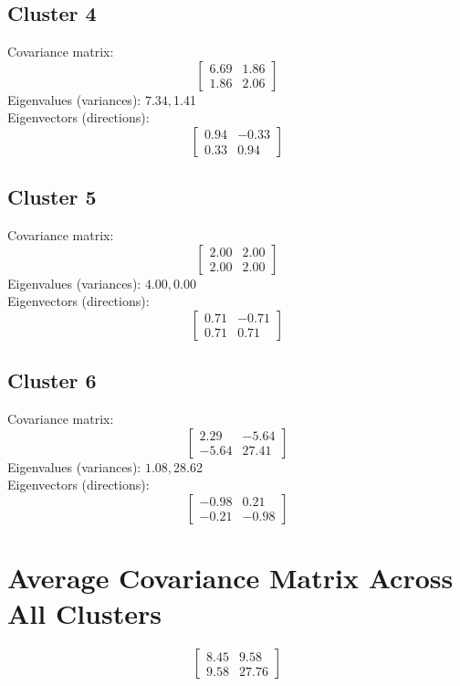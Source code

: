 \documentclass{article}
\begin{document}
\subsection*{Cluster 4}
Covariance matrix:
\[\begin{bmatrix}6.69 & 1.86 \\1.86 & 2.06\end{bmatrix}\]
Eigenvalues (variances): $ 7.34, $1.41\\
Eigenvectors (directions):
\[\begin{bmatrix}0.94 & -0.33 \\0.33 & 0.94\end{bmatrix}\]
\subsection*{Cluster 5}
Covariance matrix:
\[\begin{bmatrix}2.00 & 2.00 \\2.00 & 2.00\end{bmatrix}\]
Eigenvalues (variances): $ 4.00, $0.00\\
Eigenvectors (directions):
\[\begin{bmatrix}0.71 & -0.71 \\0.71 & 0.71\end{bmatrix}\]
\subsection*{Cluster 6}
Covariance matrix:
\[\begin{bmatrix}2.29 & -5.64 \\-5.64 & 27.41\end{bmatrix}\]
Eigenvalues (variances): $ 1.08, $28.62\\
Eigenvectors (directions):
\[\begin{bmatrix}-0.98 & 0.21 \\-0.21 & -0.98\end{bmatrix}\]
\section*{Average Covariance Matrix Across All Clusters}
\[\begin{bmatrix}8.45 & 9.58 \\9.58 & 27.76\end{bmatrix}\]
\end{document}
